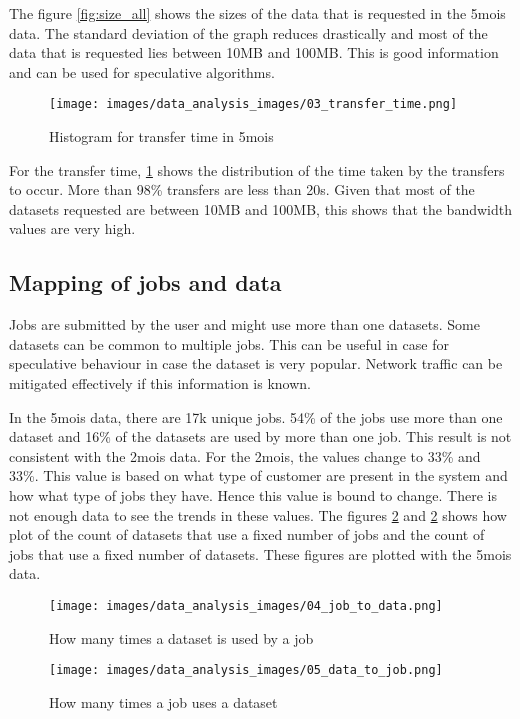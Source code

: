 The figure \ref{fig:size_all} shows the sizes of the data that is requested in the 5mois data. The standard deviation of the graph reduces drastically and most of the data that is requested lies between 10MB and 100MB. This is good information and can be used for speculative algorithms.

\begin{figure}[ht]
    \centering
    \texttt{[image: images/data\_analysis\_images/03\_transfer\_time.png]}
    \caption{Histogram for transfer time in 5mois}
    \label{fig:transfer_time}
\end{figure}

For the transfer time, \ref{fig:transfer_time} shows the distribution of the time taken by the transfers to occur. More than 98\% transfers are less than 20s. Given that most of the datasets requested are between 10MB and 100MB, this shows that the bandwidth values are very high.

\subsection{Mapping of jobs and data}

Jobs are submitted by the user and might use more than one datasets. Some datasets can be common to multiple jobs. This can be useful in case for speculative behaviour in case the dataset is very popular. Network traffic can be mitigated effectively if this information is known.

In the 5mois data, there are 17k unique jobs. 54\% of the jobs use more than one dataset and 16\% of the datasets are used by more than one job. This result is not consistent with the 2mois data. For the 2mois, the values change to 33\% and 33\%. This value is based on what type of customer are present in the system and how what type of jobs they have. Hence this value is bound to change. There is not enough data to see the trends in these values. The figures \ref{fig:job_to_data} and \ref{fig:job_to_data} shows how plot of the count of datasets that use a fixed number of jobs and the count of jobs that use a fixed number of datasets. These figures are plotted with the 5mois data.

\begin{figure}[H]
  \begin{minipage}[b]{0.5\linewidth}
    \centering
    \texttt{[image: images/data\_analysis\_images/04\_job\_to\_data.png]}
    \caption{How many times a dataset is used by a job}
    \label{fig:job_to_data}
  \end{minipage}
  \hspace{0.5cm}
  \begin{minipage}[b]{0.5\linewidth}
    \centering
    \texttt{[image: images/data\_analysis\_images/05\_data\_to\_job.png]}
    \caption{How many times a job uses a dataset}
    \label{fig:job_to_data}
  \end{minipage}
\end{figure}

